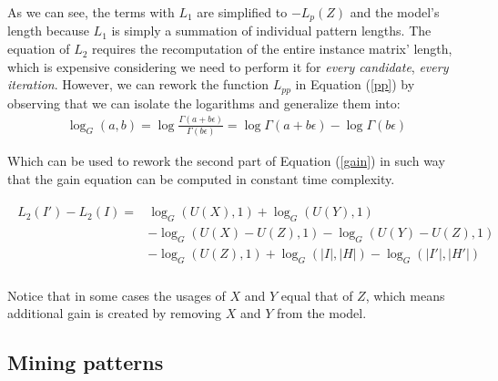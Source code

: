 \documentclass{llncs}
\begin{document}
As we can see, the terms with $L_1$ are simplified to $- L_p(Z)$ and the model's length because $L_1$ is simply a summation of individual pattern lengths. The equation of $L_2$ requires the recomputation of the entire instance matrix' length, which is expensive considering we need to perform it for \emph{every candidate}, \emph{every iteration}. However, we can rework the function $L_{pp}$ in Equation (\ref{pp}) by observing that we can isolate the logarithms and generalize them into:
\begin{align}
	\log_G(a,b) = \log \frac{\Gamma(a+ b\epsilon)}{\Gamma(b\epsilon)} = \log \Gamma(a+ b\epsilon) - \log \Gamma(b\epsilon)
\end{align} 

\noindent Which can be used to rework the second part of Equation (\ref{gain}) in such way that the gain equation can be computed in constant time complexity.

\begin{align}
\begin{split}
	L_2(I') - L_2(I) = &\log_G(U(X),1) + \log_G(U(Y),1) \\
			      &- \log_G(U(X)-U(Z),1) - \log_G(U(Y)-U(Z),1) \\
			      &- \log_G(U(Z),1) + \log_G(|I|,|H|) - \log_G(|I'|,|H'|) \\
\end{split}   
\end{align}

\noindent Notice that in some cases the usages of $X$ and $Y$ equal that of $Z$, which means additional gain is created by removing $X$ and $Y$ from the model. 

\subsection{Mining patterns}
\end{document}
